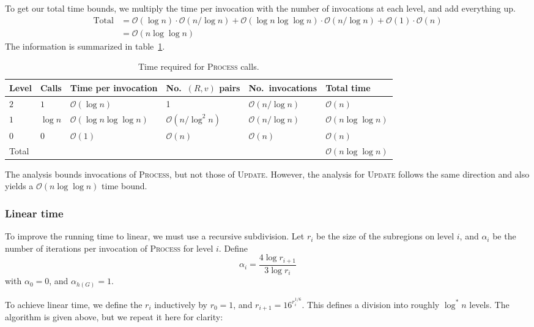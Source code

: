 \documentclass[11pt]{article}
\newcommand{\ra}[1]{\renewcommand{\arraystretch}{#1}}
\begin{document}
To get our total time bounds, we multiply the time per invocation with the number of invocations at each level, and add everything up.
\begin{align*}
  \text{Total} &= \mathcal{O}(\log n) \cdot \mathcal{O}(n/\log n) + \mathcal{O}(\log n \log \log n) \cdot \mathcal{O}(n/ \log n) + \mathcal{O}(1) \cdot \mathcal{O}(n) \\
               &= \mathcal{O}(n \log \log n)
\end{align*}
The information is summarized in table~\ref{tab:process}.


\begin{table}[!h]\centering
\caption{Time required for \textsc{Process} calls.}
\label{tab:process}
\ra{1.3}
\begin{tabular}{@{}llllll@{}} \toprule
  Level & Calls & Time per invocation & No.\ $(R,v)$ pairs & No.\ invocations & Total time\\ \midrule
  $2$ & $1$ & $\mathcal{O}(\log n)$ & 1 & $\mathcal{O}(n/\log n)$ & $\mathcal{O}(n)$\\
  $1$ & $\log n$ & $\mathcal{O}(\log n \log \log n)$ & $\mathcal{O}(n/\log^2 n)$ & $\mathcal{O}(n/\log n)$ & $\mathcal{O}(n\log \log n)$\\
  $0$ & $0$ & $\mathcal{O}(1)$ & $\mathcal{O}(n)$ & $\mathcal{O}(n)$ & $\mathcal{O}(n)$\\ \midrule
  Total & & & & & $\mathcal{O}(n\log \log n)$\\
  \bottomrule
\end{tabular}
\end{table}

The analysis bounds invocations of \textsc{Process}, but not those of \textsc{Update}. However, the analysis for \textsc{Update} follows the same direction and also yields a $\mathcal{O}(n \log \log n)$ time bound.

\subsubsection{Linear time}
\label{sec:linear-time}

To improve the running time to linear, we must use a recursive subdivision. Let $r_i$ be the size of the subregions on level $i$, and $\alpha_i$ be the number of iterations per invocation of \textsc{Process} for level $i$. Define
\[
  \alpha_i = \frac{4\log r_{i+1}}{3 \log r_i}
\]
with $\alpha_0 = 0$, and $\alpha_{h(G)} = 1$.

To achieve linear time, we define the $r_i$ inductively by $r_0 = 1$, and $r_{i+1} = 16^{r_i^{1/6}}$. This defines a division into roughly $\log^{*} n$ levels. The algorithm is given above, but we repeat it here for clarity:
\end{document}
